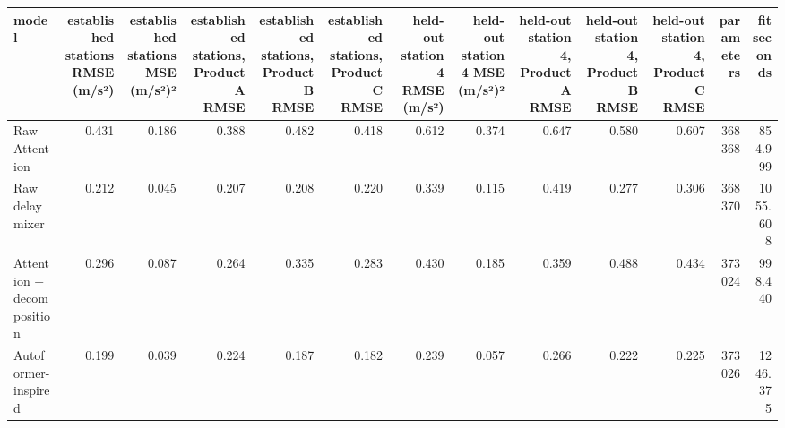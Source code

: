 \begin{tabular}{lrrrrrrrrrrrr}
\toprule
model & established stations RMSE (m/s²) & established stations MSE (m/s²)² & established stations, Product A RMSE & established stations, Product B RMSE & established stations, Product C RMSE & held-out station 4 RMSE (m/s²) & held-out station 4 MSE (m/s²)² & held-out station 4, Product A RMSE & held-out station 4, Product B RMSE & held-out station 4, Product C RMSE & parameters & fit seconds \\
\midrule
Raw Attention & 0.431 & 0.186 & 0.388 & 0.482 & 0.418 & 0.612 & 0.374 & 0.647 & 0.580 & 0.607 & 368368 & 854.999 \\
Raw delay mixer & 0.212 & 0.045 & 0.207 & 0.208 & 0.220 & 0.339 & 0.115 & 0.419 & 0.277 & 0.306 & 368370 & 1055.608 \\
Attention + decomposition & 0.296 & 0.087 & 0.264 & 0.335 & 0.283 & 0.430 & 0.185 & 0.359 & 0.488 & 0.434 & 373024 & 998.440 \\
Autoformer-inspired & 0.199 & 0.039 & 0.224 & 0.187 & 0.182 & 0.239 & 0.057 & 0.266 & 0.222 & 0.225 & 373026 & 1246.375 \\
\bottomrule
\end{tabular}

